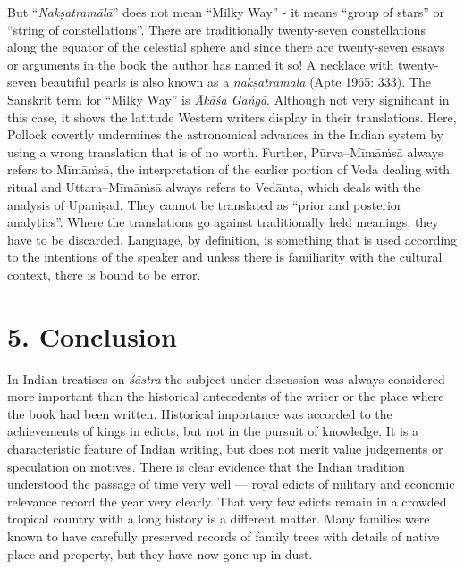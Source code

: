 But “\textit{Nakṣatramālā}” does not mean “Milky Way” - it means “group of stars” or “string of constellations”. There are traditionally twenty-seven constellations along the equator of the celestial sphere and since there are twenty-seven essays or arguments in the book the author has named it so! A necklace with twenty-seven beautiful pearls is also known as a \textit{nakṣatramālā} (Apte 1965: 333). The Sanskrit term for “Milky Way” is \textit{Ākāśa Gańgā}. Although not very significant in this case, it shows the latitude Western writers display in their translations. Here, Pollock covertly undermines the astronomical advances in the Indian system by using a wrong translation that is of no worth. Further, Pūrva--Mīmāṁsā always refers to Mīmāṁsā, the interpretation of the earlier portion of Veda dealing with ritual and Uttara--Mīmāṁsā always refers to Vedānta, which deals with the analysis of Upaniṣad. They cannot be translated as “prior and posterior analytics”. Where the translations go against traditionally held meanings, they have to be discarded. Language, by definition, is something that is used according to the intentions of the speaker and unless there is familiarity with the cultural context, there is bound to be error.


\section*{5. Conclusion}

In Indian treatises on \textit{śāstra} the subject under discussion was always considered more important than the historical antecedents of the writer or the place where the book had been written. Historical importance was accorded to the achievements of kings in edicts, but not in the pursuit of knowledge. It is a characteristic feature of Indian writing, but does not merit value judgements or speculation on motives. There is clear evidence that the Indian tradition understood the passage of time very well --- royal edicts of military and economic relevance record the year very clearly. That very few edicts remain in a crowded tropical country with a long history is a different matter. Many families were known to have carefully preserved records of family trees with details of native place and property, but they have now gone up in dust.

